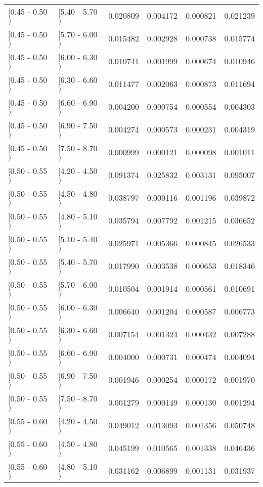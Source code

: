 \begin{longtable}{| l | l | r | r | r | r |}
$[$0.45 - 0.50$)$ & $[$5.40 - 5.70$)$ & 0.020809 & 0.004172 & 0.000821 & 0.021239 \\
$[$0.45 - 0.50$)$ & $[$5.70 - 6.00$)$ & 0.015482 & 0.002928 & 0.000738 & 0.015774 \\
$[$0.45 - 0.50$)$ & $[$6.00 - 6.30$)$ & 0.010741 & 0.001999 & 0.000674 & 0.010946 \\
$[$0.45 - 0.50$)$ & $[$6.30 - 6.60$)$ & 0.011477 & 0.002063 & 0.000873 & 0.011694 \\
$[$0.45 - 0.50$)$ & $[$6.60 - 6.90$)$ & 0.004200 & 0.000754 & 0.000554 & 0.004303 \\
$[$0.45 - 0.50$)$ & $[$6.90 - 7.50$)$ & 0.004274 & 0.000573 & 0.000231 & 0.004319 \\
$[$0.45 - 0.50$)$ & $[$7.50 - 8.70$)$ & 0.000999 & 0.000121 & 0.000098 & 0.001011 \\
$[$0.50 - 0.55$)$ & $[$4.20 - 4.50$)$ & 0.091374 & 0.025832 & 0.003131 & 0.095007 \\
$[$0.50 - 0.55$)$ & $[$4.50 - 4.80$)$ & 0.038797 & 0.009116 & 0.001196 & 0.039872 \\
$[$0.50 - 0.55$)$ & $[$4.80 - 5.10$)$ & 0.035794 & 0.007792 & 0.001215 & 0.036652 \\
$[$0.50 - 0.55$)$ & $[$5.10 - 5.40$)$ & 0.025971 & 0.005366 & 0.000845 & 0.026533 \\
$[$0.50 - 0.55$)$ & $[$5.40 - 5.70$)$ & 0.017990 & 0.003538 & 0.000653 & 0.018346 \\
$[$0.50 - 0.55$)$ & $[$5.70 - 6.00$)$ & 0.010504 & 0.001914 & 0.000561 & 0.010691 \\
$[$0.50 - 0.55$)$ & $[$6.00 - 6.30$)$ & 0.006640 & 0.001204 & 0.000587 & 0.006773 \\
$[$0.50 - 0.55$)$ & $[$6.30 - 6.60$)$ & 0.007154 & 0.001324 & 0.000432 & 0.007288 \\
$[$0.50 - 0.55$)$ & $[$6.60 - 6.90$)$ & 0.004000 & 0.000731 & 0.000474 & 0.004094 \\
$[$0.50 - 0.55$)$ & $[$6.90 - 7.50$)$ & 0.001946 & 0.000254 & 0.000172 & 0.001970 \\
$[$0.50 - 0.55$)$ & $[$7.50 - 8.70$)$ & 0.001279 & 0.000149 & 0.000130 & 0.001294 \\
$[$0.55 - 0.60$)$ & $[$4.20 - 4.50$)$ & 0.049012 & 0.013093 & 0.001356 & 0.050748 \\
$[$0.55 - 0.60$)$ & $[$4.50 - 4.80$)$ & 0.045199 & 0.010565 & 0.001338 & 0.046436 \\
$[$0.55 - 0.60$)$ & $[$4.80 - 5.10$)$ & 0.031162 & 0.006899 & 0.001131 & 0.031937 \\

\end{longtable}
